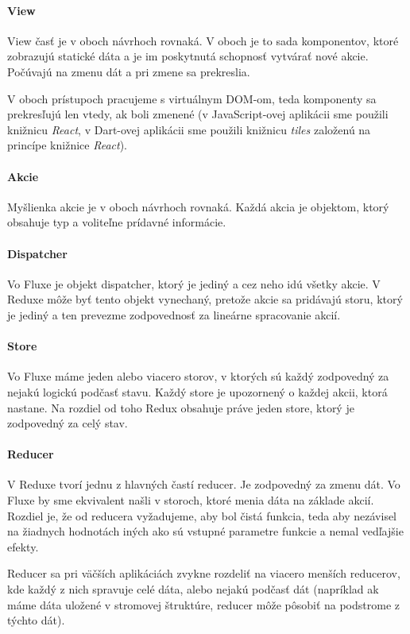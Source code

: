\paragraph{View}%
View časť je v oboch návrhoch rovnaká. V oboch je to sada komponentov, ktoré zobrazujú statické dáta a je im poskytnutá schopnosť vytvárať nové akcie. Počúvajú na zmenu dát a pri zmene sa prekreslia.

V oboch prístupoch pracujeme s virtuálnym DOM-om, teda komponenty sa prekresľujú len vtedy, ak boli zmenené (v JavaScript-ovej aplikácii sme použili knižnicu \emph{React}, v Dart-ovej aplikácii sme použili knižnicu \emph{tiles} založenú na princípe knižnice \emph{React}).

\paragraph{Akcie}
Myšlienka akcie je v oboch návrhoch rovnaká. Každá akcia je objektom, ktorý obsahuje typ a voliteľne prídavné informácie.

\paragraph{Dispatcher}
Vo Fluxe je objekt dispatcher, ktorý je jediný a cez neho idú všetky akcie. V Reduxe môže byť tento objekt vynechaný, pretože akcie sa pridávajú storu, ktorý je jediný a ten prevezme zodpovednosť za lineárne spracovanie akcií.

\paragraph{Store}
Vo Fluxe máme jeden alebo viacero storov, v ktorých sú každý zodpovedný za nejakú logickú podčasť stavu. Každý store je upozornený o každej akcii, ktorá nastane. Na rozdiel od toho Redux obsahuje práve jeden store, ktorý je zodpovedný za celý stav.

\paragraph{Reducer}
V Reduxe tvorí jednu z hlavných častí reducer. Je zodpovedný za zmenu dát. Vo Fluxe by sme ekvivalent našli v storoch, ktoré menia dáta na základe akcií. Rozdiel je, že od reducera vyžadujeme, aby bol čistá funkcia, teda aby nezávisel na žiadnych hodnotách iných ako sú vstupné parametre funkcie a nemal vedľajšie efekty. 

Reducer sa pri väčších aplikáciách zvykne rozdeliť na viacero menších reducerov, kde každý z nich spravuje celé dáta, alebo nejakú podčasť dát (napríklad ak máme dáta uložené v stromovej štruktúre, reducer môže pôsobiť na podstrome z týchto dát).

